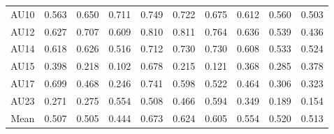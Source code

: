 \documentclass[a4paper, 10pt, conference]{ieeeconf}      \usepackage{FG2017}
\begin{document}
\begin{table*}[t]
\begin{center}
\begin{tabular}{c|c|c|c|c|c|c|c|c|c|}
AU10 & 0.563 & 0.650 & 0.711 & 0.749 & 0.722 & 0.675 & 0.612 & 0.560 & 0.503 \\ 
AU12 & 0.627 & 0.707 & 0.609 & 0.810 & 0.811 & 0.764 & 0.636 & 0.539 & 0.436 \\ 
AU14 & 0.618 & 0.626 & 0.516 & 0.712 & 0.730 & 0.730 & 0.608 & 0.533 & 0.524 \\ 
AU15 & 0.398 & 0.218 & 0.102 & 0.678 & 0.215 & 0.121 & 0.368 & 0.285 & 0.378 \\ 
AU17 & 0.699 & 0.468 & 0.246 & 0.741 & 0.598 & 0.522 & 0.464 & 0.306 & 0.323 \\
AU23 & 0.271 & 0.275 & 0.554 & 0.508 & 0.466 & 0.594 & 0.349 & 0.189 & 0.154 \\ 
\hline
Mean & 0.507 & 0.505 & 0.444 & 0.673 & 0.624 & 0.605 & 0.554 & 0.520 & 0.513 
 \\
\hline
\end{tabular}
\end{center}
\end{table*}
\end{document}
